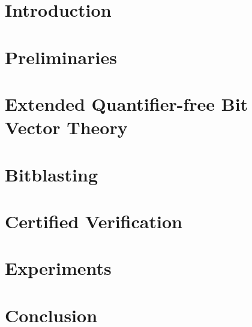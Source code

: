 \documentclass[sigconf,review]{acmart}
\begin{document}
\section{Introduction}
\label{section:introduction}

\section{Preliminaries}
\label{section:preliminaries}

\section{\cryptoline}
\label{section:cryptoline}



\section{Extended Quantifier-free Bit Vector Theory}
\label{section:qfbv-semantics}



\section{Bitblasting}
\label{section:bitblasting}



\section{Certified Verification}
\label{section:certified-verification}

\section{Experiments}
\label{section:experiments}

\section{Conclusion}
\label{section:conclusion}

%
%


\end{document}
